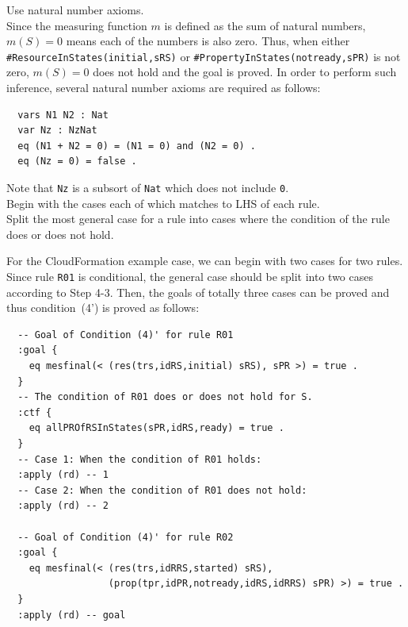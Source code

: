 \documentclass[12pt]{report}
\newcommand{\stt}[1]{{\small{\tt {#1}}}}
\begin{document}
\vspace{0.3cm}
 Use natural number axioms. \\ Since the
measuring function $m$ is defined as the sum of natural numbers, $m(S)
= 0$ means each of the numbers is also zero. Thus, when either
\stt{\#ResourceInStates(initial,sRS)} or
\stt{\#PropertyInStates(notready,sPR)} is not zero, $m(S) = 0$ does
not hold and the goal is proved. In order to perform such inference,
several natural number axioms are required as follows:
\begin{verbatim}
  vars N1 N2 : Nat
  var Nz : NzNat
  eq (N1 + N2 = 0) = (N1 = 0) and (N2 = 0) .
  eq (Nz = 0) = false .
\end{verbatim}
Note that {\tt Nz} is a subsort of {\tt Nat} which does not
include {\tt 0}.\\

\vspace{0.3cm}
 Begin with the cases each of which matches to
LHS of each rule. \\ 
 Split the most general case for a rule into
cases where the condition of the rule does or does not hold. 

For the CloudFormation example case, we can begin with two cases for
two rules. Since rule {\tt R01} is conditional, the general case
should be split into two cases according to Step 4-3. Then, the goals
of totally three cases can be proved and thus condition~(4') is proved
as follows:
\begin{verbatim}
  -- Goal of Condition (4)' for rule R01
  :goal {
    eq mesfinal(< (res(trs,idRS,initial) sRS), sPR >) = true .
  }
  -- The condition of R01 does or does not hold for S.
  :ctf {
    eq allPROfRSInStates(sPR,idRS,ready) = true .
  }
  -- Case 1: When the condition of R01 holds:
  :apply (rd) -- 1
  -- Case 2: When the condition of R01 does not hold:
  :apply (rd) -- 2

  -- Goal of Condition (4)' for rule R02
  :goal {
    eq mesfinal(< (res(trs,idRRS,started) sRS),
                  (prop(tpr,idPR,notready,idRS,idRRS) sPR) >) = true .
  }
  :apply (rd) -- goal
\end{verbatim}

\end{document}
